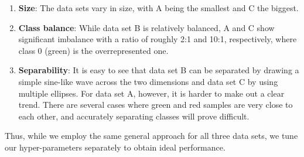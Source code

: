 \documentclass[acmsmall,nonacm]{acmart}
\begin{document}
\begin{enumerate}
	\item \textbf{Size}: The data sets vary in size, with A being the smallest and C the biggest.
	\item \textbf{Class balance}: While data set B is relatively balanced, A and C show significant imbalance with a ratio of roughly 2:1 and 10:1, respectively, where class 0 (green) is the overrepresented one.
	\item \textbf{Separability}: It is easy to see that data set B can be separated by drawing a simple sine-like wave across the two dimensions and data set C by using multiple ellipses. For data set A, however, it is harder to make out a clear trend. There are several cases where green and red samples are very close to each other, and accurately separating classes will prove difficult.
\end{enumerate}

Thus, while we employ the same general approach for all three data sets, we tune our hyper-parameters separately to obtain ideal performance.
\end{document}
